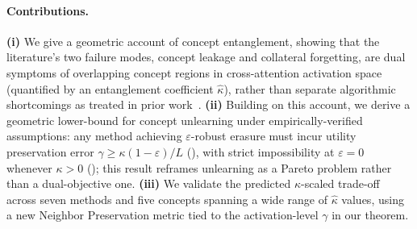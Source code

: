 \paragraph{Contributions.} 
\textbf{(i)} We give a geometric account of concept entanglement, showing that the literature's two failure modes, 
concept leakage and collateral forgetting, are dual symptoms of overlapping concept regions in cross-attention activation space (quantified by an entanglement coefficient $\hat\kappa$), rather than separate algorithmic shortcomings as treated in prior work~\citep{gandikota2023erasing,zhang2024defensive,srivatsan2025stereo,cywinski2025saeuron}. \textbf{(ii)} Building on this account,
we derive a geometric lower-bound for concept unlearning under empirically-verified assumptions: any method achieving $\varepsilon$-robust erasure must incur utility preservation error $\gamma \geq \kappa(1-\varepsilon)/L$ (), with strict impossibility at $\varepsilon = 0$ whenever $\kappa > 0$ (); this result reframes unlearning as a Pareto problem rather than a dual-objective one. \textbf{(iii)} We validate the predicted $\kappa$-scaled trade-off across seven methods and five concepts spanning a wide range of $\hat\kappa$ values, using a new Neighbor Preservation metric tied to the activation-level $\gamma$ in our theorem.



